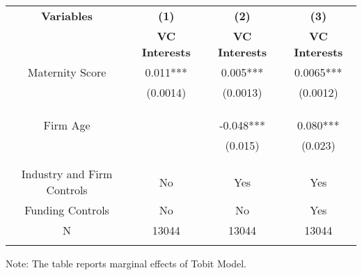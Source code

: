  \begin{table}[htbp]
    \begin{tabular}{c c c c}
    \toprule
    \textbf{Variables} & \textbf{(1)} & \textbf{(2)} & \textbf{(3)}               \\ 
    \textbf & \textbf{VC Interests} & \textbf{VC Interests} & \textbf{VC Interests}  \\ 

    \midrule
    Maternity Score     &    0.011*** &      0.005***    &    0.0065***   \\
                        &    (0.0014)  &      (0.0013)   &   (0.0012)  \\
                        &             &                  &               \\

                        &             &                  &               \\
                        &             &                  &          \\
    Firm Age            &             &      -0.048***   &    0.080***        \\
                        &             &      (0.015)     &   (0.023)       \\
                        &             &                  &               \\
                        &             &                  &            \\

Industry and Firm Controls   &   No        &   Yes       &        Yes    \\
    Funding Controls    &   No             &   No        &       Yes        \\

    \midrule
     N                  &   13044          &      13044  &      13044      \\          
    \bottomrule
    \addlinespace[1ex]
    \multicolumn{3}{l}{\textsuperscript{***}$P<0.01$, 
      \textsuperscript{**}$P<0.05$, 
      \textsuperscript{*}$P<0.1$}
    \end{tabular}
    \newline
    Note: The table reports marginal effects of Tobit Model.
\end{table}
